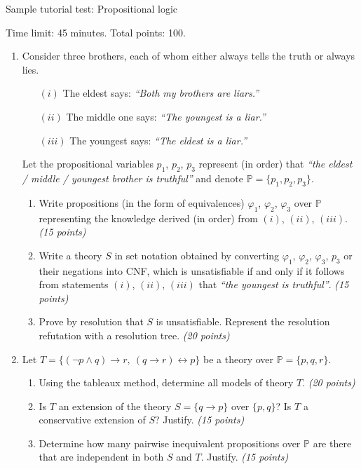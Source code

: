 \documentclass[a4paper]{article}
\begin{document}
\thispagestyle{empty}


\begin{center}
    \large{Sample tutorial test: Propositional logic}    
\end{center}

Time limit: 45 minutes. Total points: 100.

\bigskip

\begin{enumerate}
\item Consider three brothers, each of whom either always tells the truth or always lies.
\begin{enumerate}
\item[$(i)$] The eldest says: \emph{``Both my brothers are liars.''}
\item[$(ii)$] The middle one says: \emph{``The youngest is a liar.''}
\item[$(iii)$] The youngest says: \emph{``The eldest is a liar.''}
\end{enumerate}
Let the propositional variables $p_1$, $p_2$, $p_3$ represent (in order) that \emph{``the eldest / middle / youngest brother is truthful''} and denote $\mathbb{P}=\{p_1,p_2,p_3\}$.
\begin{enumerate}
\item Write propositions (in the form of equivalences) $\varphi_1$, $\varphi_2$, $\varphi_3$ over $\mathbb{P}$ representing the knowledge derived (in order) from $(i)$, $(ii)$, $(iii)$. {\it (15 points)}
\item Write a theory $S$ in set notation obtained by converting $\varphi_1$, $\varphi_2$, $\varphi_3$, $p_3$ or their negations into CNF, which is unsatisfiable if and only if it follows from statements $(i)$, $(ii)$, $(iii)$ that \emph{``the youngest is truthful''}. {\it (15 points)}
\item Prove by resolution that $S$ is unsatisfiable. Represent the resolution refutation with a resolution tree. {\it (20 points)}
\end{enumerate}

\item Let $T=\{(\neg p \wedge q) \to r,\ (q \to r) \leftrightarrow p\}$ be a theory over $\mathbb{P}=\{p,q,r\}$.
\begin{enumerate}
    \item Using the tableaux method, determine all models of theory $T$. {\it (20 points)}
    \item Is $T$ an extension of the theory $S=\{q \to p\}$ over $\{p,q\}$? Is $T$ a conservative extension of $S$? Justify. {\it (15 points)}
    \item Determine how many pairwise inequivalent propositions over $\mathbb{P}$ are there that are independent in both $S$ and $T$. Justify. {\it (15 points)}
\end{enumerate}

\end{enumerate}
\end{document}
